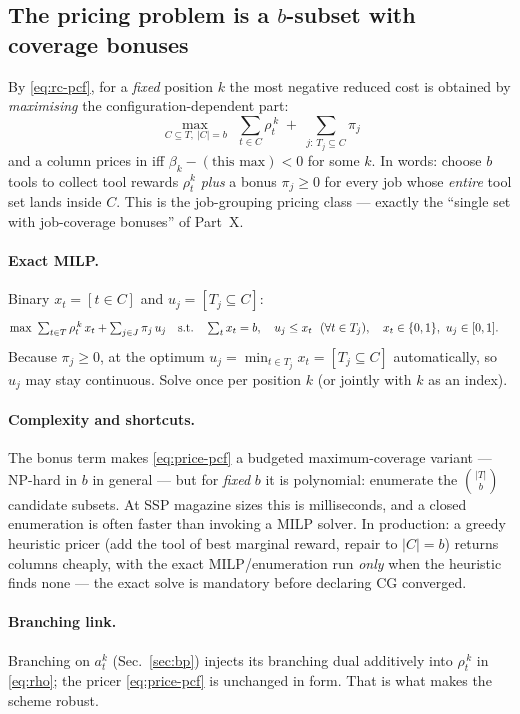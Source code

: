 \documentclass[11pt,a4paper]{article}
\theoremstyle{plain}
\theoremstyle{definition}
\begin{document}
\subsection{The pricing problem is a $b$-subset with coverage bonuses}
By \eqref{eq:rc-pcf}, for a \emph{fixed} position $k$ the most negative reduced cost is obtained
by \emph{maximising} the configuration-dependent part:
\begin{equation}\label{eq:price-pcf}
  \boxed{\;\max_{\,C\subseteq T,\ |C|=b}\ \ \sum_{t\in C}\rho_t^{\,k}\;+\;\sum_{j:\,T_j\subseteq C}\pi_j\;}
\end{equation}
and a column prices in iff $\beta_k-(\text{this max})<0$ for some $k$. In words: choose $b$ tools
to collect tool rewards $\rho_t^k$ \emph{plus} a bonus $\pi_j\ge0$ for every job whose
\emph{entire} tool set lands inside $C$. This is the job-grouping pricing class --- exactly the
``single set with job-coverage bonuses'' of Part~X.

\paragraph{Exact MILP.} Binary $x_t=[t\in C]$ and $u_j=[T_j\subseteq C]$:
\begin{align}
  \max\ & \textstyle\sum_{t\in T}\rho_t^{\,k}\,x_t+\sum_{j\in J}\pi_j\,u_j
   \quad\text{s.t.}\quad \textstyle\sum_t x_t=b,\quad u_j\le x_t\ \ (\forall t\in T_j),\quad
   x_t\in\{0,1\},\ u_j\in[0,1].\notag
\end{align}
Because $\pi_j\ge0$, at the optimum $u_j=\min_{t\in T_j}x_t=[T_j\subseteq C]$ automatically, so
$u_j$ may stay continuous. Solve once per position $k$ (or jointly with $k$ as an index).

\paragraph{Complexity and shortcuts.} The bonus term makes \eqref{eq:price-pcf} a budgeted
maximum-coverage variant --- NP-hard in $b$ in general --- but for \emph{fixed} $b$ it is
polynomial: enumerate the $\binom{|T|}{b}$ candidate subsets. At SSP magazine sizes this is
milliseconds, and a closed enumeration is often faster than invoking a MILP solver. In
production: a greedy heuristic pricer (add the tool of best marginal reward, repair to
$|C|=b$) returns columns cheaply, with the exact MILP/enumeration run \emph{only} when the
heuristic finds none --- the exact solve is mandatory before declaring CG converged.

\paragraph{Branching link.} Branching on $a_t^k$ (Sec.~\ref{sec:bp}) injects its branching dual
additively into $\rho_t^{\,k}$ in \eqref{eq:rho}; the pricer \eqref{eq:price-pcf} is unchanged in
form. That is what makes the scheme robust.
\end{document}
